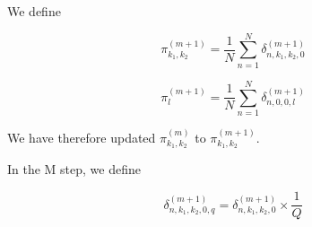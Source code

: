 \documentclass[12pt]{article}
\begin{document}
We define 

$$ \pi^{(m+1)}_{k_1, k_2} = \frac{1}{N}\sum_{n=1}^{N} \delta^{(m+1)}_{n, k_1, k_2, 0} $$

$$ \pi^{(m+1)}_{l} = \frac{1}{N}\sum_{n=1}^{N} \delta^{(m+1)}_{n, 0, 0, l} $$

We have therefore updated $\pi^{(m)}_{k_1, k_2}$ to $\pi^{(m+1)}_{k_1, k_2}$.

In the M step, we define 

$$ \delta^{(m+1)}_{n, k_1, k_2, 0, q} =  \delta^{(m+1)}_{n, k_1, k_2, 0} \times \frac{1}{Q}  $$ 


%
%
%
%
%
%
%
%
%
%
%
%
%
\end{document}
